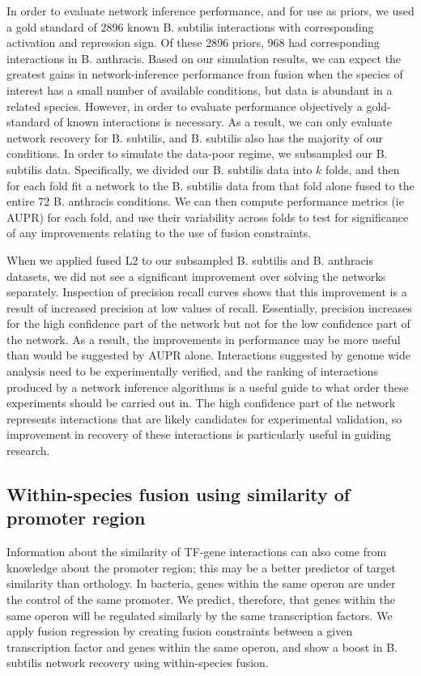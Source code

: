 \documentclass[11pt]{article}
\begin{document}
In order to evaluate network inference performance, and for use as priors, we used a gold standard of 2896 known B. subtilis interactions with corresponding activation and repression sign. Of these 2896 priors, 968 had corresponding interactions in B. anthracis. Based on our simulation results, we can expect the greatest gains in network-inference performance from fusion when the species of interest has a small number of available conditions, but data is abundant in a related species. However, in order to evaluate performance objectively a gold-standard of known interactions is necessary. As a result, we can only evaluate network recovery for B. subtilis, and B. subtilis also has the majority of our conditions. In order to simulate the data-poor regime, we subsampled our B. subtilis data. Specifically, we divided our B. subtilis data into $k$ folds, and then for each fold fit a network to the B. subtilis data from that fold alone fused to the entire 72 B. anthracis conditions. We can then compute performance metrics (ie AUPR) for each fold, and use their variability across folds to test for significance of any improvements relating to the use of fusion constraints. 

When we applied fused L2 to our subsampled B. subtilis and B. anthracis datasets, we did not see a significant improvement over solving the networks separately. Inspection of precision recall curves shows that this improvement is a result of increased precision at low values of recall. Essentially, precision increases for the high confidence part of the network but not for the low confidence part of the network. As a result, the improvements in performance may be more useful than would be suggested by AUPR alone. Interactions suggested by genome wide analysis need to be experimentally verified, and the ranking of interactions produced by a network inference algorithms is a useful guide to what order these experiments should be carried out in. The high confidence part of the network represents interactions that are likely candidates for experimental validation, so improvement in recovery of these interactions is particularly useful in guiding research. 

\subsection{Within-species fusion using similarity of promoter region}
Information about the similarity of TF-gene interactions can also come from knowledge about the promoter region; this may be a better predictor of target similarity than orthology. In bacteria, genes within the same operon are under the control of the same promoter. We predict, therefore, that genes within the same operon will be regulated similarly by the same transcription factors. We apply fusion regression by creating fusion constraints between a given transcription factor and genes within the same operon, and show a boost in B. subtilis network recovery using within-species fusion. 
\end{document}

